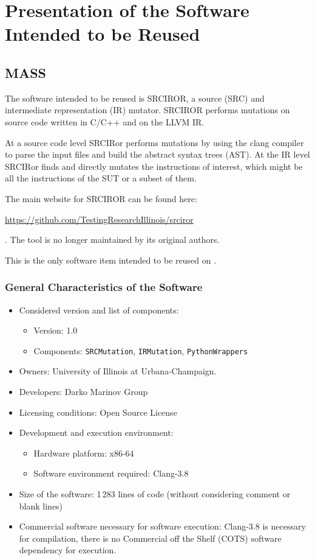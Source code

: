 
\chapter{Presentation of the Software Intended to be Reused}

\section{MASS}

The software intended to be reused is SRCIROR, a source (SRC) and intermediate representation (IR) mutator. SRCIROR performs mutations on source code written in C/C++ and on the LLVM IR.

At a source code level SRCIRor performs mutations by using the clang compiler to parse the input files and build the abstract syntax trees (AST). At the IR level SRCIRor finds and directly mutates the instructions of interest, which might be all the instructions of the SUT or a subset of them. 

The main website for SRCIROR can be found here: \begin{scriptsize}\url{https://github.com/TestingResearchIllinois/srciror}\end{scriptsize}. The tool is no longer maintained by its original authors.

This is the only software item intended to be reused on \MASS.

\subsection{General Characteristics of the Software}

\begin{itemize}
	\item Considered version and list of components:
	\begin{itemize}
		\item Version: 1.0
		\item Components: \texttt{SRCMutation}, \texttt{IRMutation}, \texttt{PythonWrappers}
	\end{itemize}
	\item Owners: University of Illinois at Urbana-Champaign.
	\item Developers: Darko Marinov Group
	\item Licensing conditions: Open Source License
	\item Development and execution environment:
	\begin{itemize}
		\item Hardware platform: x86-64
		\item Software environment required: Clang-3.8
	\end{itemize}
	\item Size of the software: 1\,283 lines of code (without considering comment or blank lines)
	\item Commercial software necessary for software execution: Clang-3.8 is necessary for compilation, there is no Commercial off the Shelf (COTS) software dependency for execution.
\end{itemize}


